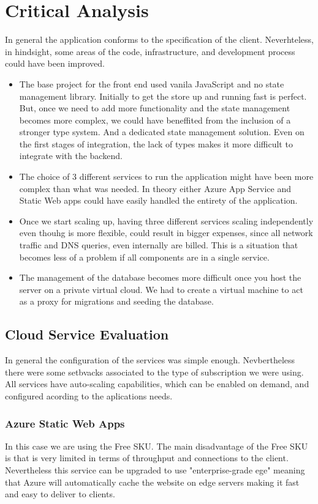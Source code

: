 \documentclass{llncs}
\begin{document}
\section{Critical Analysis}

In general the application conforms to the specification of the client. Neverhteless, in hindsight, some areas of the code, infrastructure, and development process could have been improved.
\begin{itemize}
    \item The base project for the front end used vanila JavaScript and no state management library. Initially to get the store up and running fast is perfect.
          But, once we need to add more functionality and the state management becomes more complex, we could have beneffited from the inclusion of a stronger type system. And a dedicated state management solution.
          Even on the first stages of integration, the lack of types makes it more difficult to integrate with the backend.
    \item The choice of 3 different services to run the application might have been more complex than what was needed.
          In theory either Azure App Service and Static Web apps could have easily handled the entirety of the application.
    \item Once we start scaling up, having three different services scaling independently even thouhg is more flexible, could result in bigger expenses,
          since all network traffic and DNS queries, even internally are billed. This is a situation that becomes less of a problem if all components are in a single service.

    \item The management of the database becomes more difficult once you host the server on a private virtual cloud. We had to create a virtual machine to act as a proxy for migrations and seeding the database.
\end{itemize}
\subsection{Cloud Service Evaluation}

In general the configuration of the services was simple enough. Nevbertheless there were some setbvacks associated to the type of subscription we were using.
All services have auto-scaling capabilities, which can be enabled on demand, and configured acording to the aplications needs.


\subsubsection{Azure Static Web Apps}
In this case we are using the Free SKU. The main disadvantage of the Free SKU is that is very limited in terms of throughput and connections to the client.
Nevertheless this service can be upgraded to use "enterprise-grade ege" meaning that Azure will automatically cache the website on edge servers making it fast and easy to deliver to clients.
\end{document}

